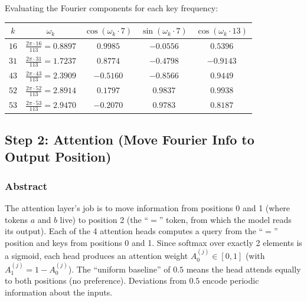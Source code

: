 \documentclass[11pt,a4paper]{article}
\begin{document}
Evaluating the Fourier components for each key frequency:
\begin{center}
\begin{tabular}{|c|c|c|c|c|}
\hline
$k$ & $\omega_k$ & $\cos(\omega_k \cdot 7)$ & $\sin(\omega_k \cdot 7)$ & $\cos(\omega_k \cdot 13)$ \\ \hline
  $16$ & $\frac{2\pi \cdot 16}{113} = 0.8897$ & $0.9985$ & $-0.0556$ & $0.5396$ \\ \hline
  $31$ & $\frac{2\pi \cdot 31}{113} = 1.7237$ & $0.8774$ & $-0.4798$ & $-0.9143$ \\ \hline
  $43$ & $\frac{2\pi \cdot 43}{113} = 2.3909$ & $-0.5160$ & $-0.8566$ & $0.9449$ \\ \hline
  $52$ & $\frac{2\pi \cdot 52}{113} = 2.8914$ & $0.1797$ & $0.9837$ & $0.9938$ \\ \hline
  $53$ & $\frac{2\pi \cdot 53}{113} = 2.9470$ & $-0.2070$ & $0.9783$ & $0.8187$ \\ \hline
\end{tabular}
\end{center}

\subsection{Step 2: Attention (Move Fourier Info to Output Position)}

\subsubsection*{Abstract}
The attention layer's job is to move information from positions 0 and 1 (where tokens $a$ and $b$ live) to position 2 (the ``$=$'' token, from which the model reads its output). Each of the 4 attention heads computes a query from the ``$=$'' position and keys from positions 0 and 1. Since softmax over exactly 2 elements is a sigmoid, each head produces an attention weight $A^{(j)}_0 \in [0, 1]$ (with $A^{(j)}_1 = 1 - A^{(j)}_0$). The ``uniform baseline'' of $0.5$ means the head attends equally to both positions (no preference). Deviations from $0.5$ encode periodic information about the inputs.
\end{document}
